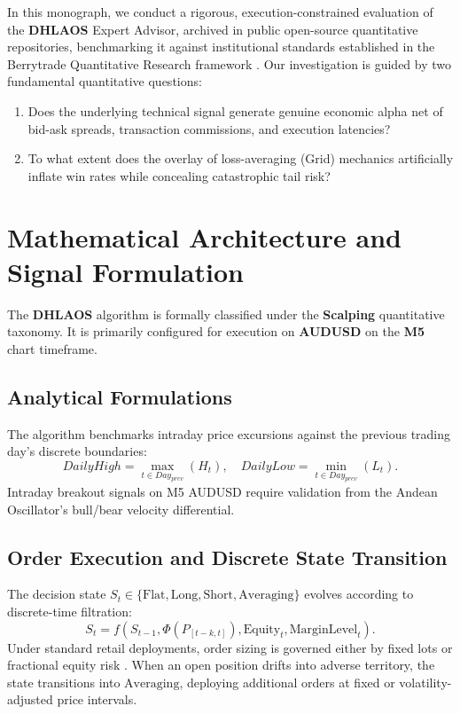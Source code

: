 \documentclass[11pt,a4paper]{article}
\begin{document}
In this monograph, we conduct a rigorous, execution-constrained evaluation of the \textbf{DHLAOS} Expert Advisor, archived in public open-source quantitative repositories, benchmarking it against institutional standards established in the Berrytrade Quantitative Research framework \cite{artsu2026illusion}. Our investigation is guided by two fundamental quantitative questions:
\begin{enumerate}
    \item Does the underlying technical signal generate genuine economic alpha net of bid-ask spreads, transaction commissions, and execution latencies?
    \item To what extent does the overlay of loss-averaging (Grid) mechanics artificially inflate win rates while concealing catastrophic tail risk?
\end{enumerate}

\section{Mathematical Architecture and Signal Formulation}
The \textbf{DHLAOS} algorithm is formally classified under the \textbf{Scalping} quantitative taxonomy. It is primarily configured for execution on \textbf{AUDUSD} on the \textbf{M5} chart timeframe.

\subsection{Analytical Formulations}

The algorithm benchmarks intraday price excursions against the previous trading day's discrete boundaries:
\begin{equation}
DailyHigh = \max_{t \in Day_{prev}} (H_t), \quad DailyLow = \min_{t \in Day_{prev}} (L_t).
\end{equation}
Intraday breakout signals on M5 AUDUSD require validation from the Andean Oscillator's bull/bear velocity differential.


\subsection{Order Execution and Discrete State Transition}
The decision state $S_t \in \{\text{Flat}, \text{Long}, \text{Short}, \text{Averaging}\}$ evolves according to discrete-time filtration:
\begin{equation}
S_{t} = f(S_{t-1}, \Phi(P_{[t-k, t]}), \text{Equity}_t, \text{MarginLevel}_t).
\end{equation}
Under standard retail deployments, order sizing is governed either by fixed lots or fractional equity risk \cite{lopez2018advances, carhart1997persistence}. When an open position drifts into adverse territory, the state transitions into $\text{Averaging}$, deploying additional orders at fixed or volatility-adjusted price intervals.
\end{document}
